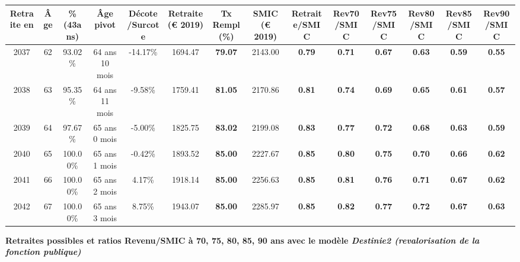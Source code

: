 \begin{adjustbox}{max width=\textwidth} 
\begin{tabular}[htb]{|c|c||c|c|c||c|c||c||c|c|c|c|c|c|} 
\hline 
 Retraite en &  Âge &  \%(43ans) &  Âge pivot &  Décote/Surcote &  Retraite (\euro{} 2019) &  Tx Rempl(\%) &  SMIC (\euro{} 2019) &  Retraite/SMIC &  Rev70/SMIC &  Rev75/SMIC &  Rev80/SMIC &  Rev85/SMIC &  Rev90/SMIC \\ 
\hline \hline 
 2037 &  62 &  93.02\% &  64 ans 10 mois &  -14.17\% &  1694.47 &  {\bf 79.07} &  2143.00 &  {\bf {\color{red} 0.79}} &  {\bf {\color{red} 0.71}} &  {\bf {\color{red} 0.67}} &  {\bf {\color{red} 0.63}} &  {\bf {\color{red} 0.59}} &  {\bf {\color{red} 0.55}} \\ 
\hline 
 2038 &  63 &  95.35\% &  64 ans 11 mois &  -9.58\% &  1759.41 &  {\bf 81.05} &  2170.86 &  {\bf {\color{red} 0.81}} &  {\bf {\color{red} 0.74}} &  {\bf {\color{red} 0.69}} &  {\bf {\color{red} 0.65}} &  {\bf {\color{red} 0.61}} &  {\bf {\color{red} 0.57}} \\ 
\hline 
 2039 &  64 &  97.67\% &  65 ans 0 mois &  -5.00\% &  1825.75 &  {\bf 83.02} &  2199.08 &  {\bf {\color{red} 0.83}} &  {\bf {\color{red} 0.77}} &  {\bf {\color{red} 0.72}} &  {\bf {\color{red} 0.68}} &  {\bf {\color{red} 0.63}} &  {\bf {\color{red} 0.59}} \\ 
\hline 
 2040 &  65 &  100.00\% &  65 ans 1 mois &  -0.42\% &  1893.52 &  {\bf 85.00} &  2227.67 &  {\bf {\color{red} 0.85}} &  {\bf {\color{red} 0.80}} &  {\bf {\color{red} 0.75}} &  {\bf {\color{red} 0.70}} &  {\bf {\color{red} 0.66}} &  {\bf {\color{red} 0.62}} \\ 
\hline 
 2041 &  66 &  100.00\% &  65 ans 2 mois &  4.17\% &  1918.14 &  {\bf 85.00} &  2256.63 &  {\bf {\color{red} 0.85}} &  {\bf {\color{red} 0.81}} &  {\bf {\color{red} 0.76}} &  {\bf {\color{red} 0.71}} &  {\bf {\color{red} 0.67}} &  {\bf {\color{red} 0.62}} \\ 
\hline 
 2042 &  67 &  100.00\% &  65 ans 3 mois &  8.75\% &  1943.07 &  {\bf 85.00} &  2285.97 &  {\bf {\color{red} 0.85}} &  {\bf {\color{red} 0.82}} &  {\bf {\color{red} 0.77}} &  {\bf {\color{red} 0.72}} &  {\bf {\color{red} 0.67}} &  {\bf {\color{red} 0.63}} \\ 
\hline 
\hline 
\end{tabular} 
\end{adjustbox} 
 
 \vspace{0.1cm} 
{\bf \noindent Retraites possibles et ratios Revenu/SMIC à 70, 75, 80, 85, 90 ans avec le modèle \emph{Destinie2 (revalorisation de la fonction publique)}}  
 
